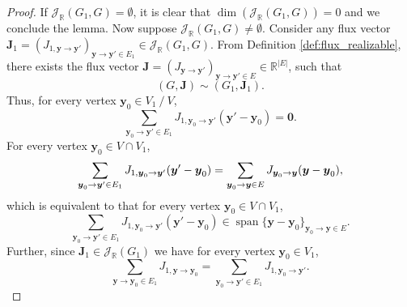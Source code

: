 \documentclass[11pt]{article}
\theoremstyle{plain}
\theoremstyle{definition}
\theoremstyle{remark}
\newcommand\RR{\mathbb{R}}
\newcommand\by{\boldsymbol{y}}
\newcommand\bJ{\boldsymbol{J}}
\newcommand{\mJ}{\mathcal{J}_{\RR}}
\DeclareMathOperator{\spn}{span}
\begin{document}
\begin{proof}
If $\mJ (G_1, G) = \emptyset$, it is clear that $\dim (\mJ (G_1, G)) = 0$ and we conclude the lemma. Now suppose $\mJ (G_1, G) \neq \emptyset$. Consider any flux vector $\bJ_1 = (J_{1, \by \to \by'})_{\by \to \by' \in E_1} \in \mJ(G_1, G)$. From Definition \ref{def:flux_realizable}, there exists the flux vector $\bJ = (J_{\by \to \by'})_{\by \to \by' \in E} \in \RR^{|E|}$, such that
\[
(G, \bJ) \sim (G_1, \bJ_1).
\]
Thus, for every vertex $\by_0 \in V_1 \ / \ V$, 
\begin{equation} \label{eq:semi_j_g1g_1}
\sum_{\by_0 \to \by' \in E_1} J_{1, \by_0  \to \by'}  (\by' - \by_0) = \mathbf{0}.
\end{equation}
For every vertex $\by_0 \in V \cap V_1$, 
\begin{equation} \notag
 \sum_{\by_0 \to \by' \in E_1} J_{1, \by_0  \to \by'}  (\by' - \by_0)
= \sum_{\by_0 \to \by \in E} J_{\by_0  \to \by} (\by - \by_0),
\end{equation}
which is equivalent to that for every vertex $\by_0 \in V \cap V_1$,
\begin{equation} \label{eq:semi_j_g1g_2}
 \sum_{\by_0 \to \by' \in E_1} J_{1, \by_0  \to \by'}  (\by' - \by_0) \in \spn \{ \by - \by_0 \}_{\by_0 \to \by \in E}.
\end{equation}
Further, since $\bJ_1 \in \mJ (G_1)$ we have for every vertex $\by_0 \in V_1$,
\begin{equation} \label{eq:semi_j_g1g_3}
 \sum_{\by \to \by_0 \in E_1} J_{1, \by \to \by_0} 
= \sum_{\by_0 \to \by' \in E_1} J_{1, \by_0 \to \by'}.
\end{equation}


\end{proof}
\end{document}
